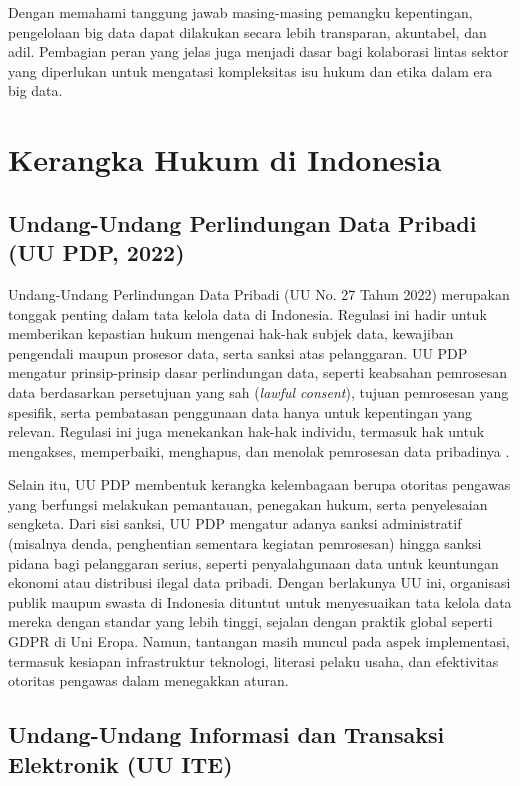 Dengan memahami tanggung jawab masing-masing pemangku kepentingan, pengelolaan big data dapat dilakukan secara lebih transparan, akuntabel, dan adil. Pembagian peran yang jelas juga menjadi dasar bagi kolaborasi lintas sektor yang diperlukan untuk mengatasi kompleksitas isu hukum dan etika dalam era big data.


\section{Kerangka Hukum di Indonesia}

\subsection{Undang-Undang Perlindungan Data Pribadi (UU PDP, 2022)}

Undang-Undang Perlindungan Data Pribadi (UU No. 27 Tahun 2022) merupakan tonggak penting dalam tata kelola data di Indonesia. Regulasi ini hadir untuk memberikan kepastian hukum mengenai hak-hak subjek data, kewajiban pengendali maupun prosesor data, serta sanksi atas pelanggaran. UU PDP mengatur prinsip-prinsip dasar perlindungan data, seperti keabsahan pemrosesan data berdasarkan persetujuan yang sah (\textit{lawful consent}), tujuan pemrosesan yang spesifik, serta pembatasan penggunaan data hanya untuk kepentingan yang relevan. Regulasi ini juga menekankan hak-hak individu, termasuk hak untuk mengakses, memperbaiki, menghapus, dan menolak pemrosesan data pribadinya \cite{pdp2022}. 

Selain itu, UU PDP membentuk kerangka kelembagaan berupa otoritas pengawas yang berfungsi melakukan pemantauan, penegakan hukum, serta penyelesaian sengketa. Dari sisi sanksi, UU PDP mengatur adanya sanksi administratif (misalnya denda, penghentian sementara kegiatan pemrosesan) hingga sanksi pidana bagi pelanggaran serius, seperti penyalahgunaan data untuk keuntungan ekonomi atau distribusi ilegal data pribadi. Dengan berlakunya UU ini, organisasi publik maupun swasta di Indonesia dituntut untuk menyesuaikan tata kelola data mereka dengan standar yang lebih tinggi, sejalan dengan praktik global seperti GDPR di Uni Eropa. Namun, tantangan masih muncul pada aspek implementasi, termasuk kesiapan infrastruktur teknologi, literasi pelaku usaha, dan efektivitas otoritas pengawas dalam menegakkan aturan.

\subsection{Undang-Undang Informasi dan Transaksi Elektronik (UU ITE)}

